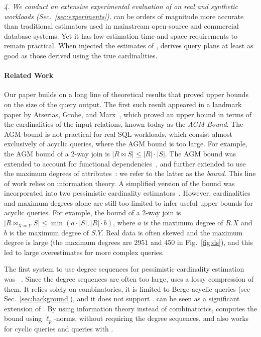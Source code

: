 {\em 4. We conduct an extensive experimental evaluation of \system on real and
  synthetic workloads (Sec.~\ref{sec:experiments}).}
  \system can be orders of magnitude more accurate than traditional
  estimators used in mainstream open-source and commercial database
  systems. Yet it has low estimation time and space
  requirements to remain practical. 
  When injected the estimates of \system, \psql derives
  query plans at least as good as those derived using the true
  cardinalities.

\paragraph{Related Work}
Our paper builds on a long line of theoretical
results that proved upper bounds on the size of the query output.  
The first such result appeared in a landmark paper by Atserias, Grohe, and
Marx~\cite{DBLP:journals/siamcomp/AtseriasGM13}, which proved an upper
bound in terms of the cardinalities of the input
relations, known today as the \emph{AGM Bound}.  The AGM bound
is not practical for real SQL workloads, which consist almost
exclusively of acyclic queries, where the AGM bound is too large.
For example, the AGM bound of a 2-way join is
$|R \Join S| \leq |R| \cdot |S|$.  The AGM bound was extended to
account for functional dependencies~\cite{DBLP:journals/jacm/GottlobLVV12,DBLP:conf/pods/KhamisNS16},
and further extended to use the maximum degrees of
attributes~\cite{DBLP:conf/pods/Khamis0S17}: we refer to the
latter as the \emph{\maxdegree bound}.  This line of work relies on information theory.  A simplified version of the \maxdegree bound was incorporated into two pessimistic cardinality estimators~\cite{DBLP:conf/sigmod/CaiBS19,DBLP:conf/cidr/HertzschuchHHL21}.
However, cardinalities and maximum degrees alone are still too limited to infer useful upper bounds for acyclic queries.  For example, the \maxdegree bound of a 2-way join is
$|R \Join_{X=Y} S| \leq \min(a\cdot|S|, |R|\cdot b)$, where $a$ is the maximum degree of $R.X$ and $b$ is the maximum degree of $S.Y$.  Real data is often skewed and the maximum degree is large (the maximum degrees are $2951$ and $450$ in Fig.~\ref{fig:ds}), and this led to large overestimates for more complex queries.

The first system to use degree sequences for pessimistic
cardinality estimation was
\safebound~\cite{SafeBound:SIGMOD23,DBLP:conf/icdt/DeedsSBC23}.
Since the degree sequences are often too large, 
\safebound uses a lossy compression of them. It relies solely on combinatorics, it is limited to Berge-acyclic queries (see Sec.~\ref{sec:background}), and it does not support \groupby. \system can be seen as a significant extension of \safebound.  By using information theory instead of combinatorics, \system computes the bound using $\ell_p$-norms, without requiring the degree
sequences, and also works for cyclic queries and queries
with \groupby.
